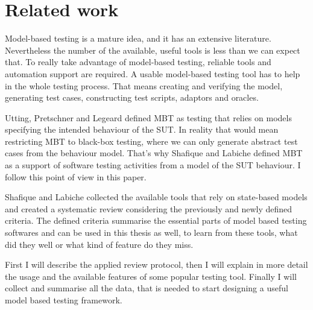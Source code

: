 \chapter{Related work}
\label{cha:relatedwork}

Model-based testing is a mature idea, and it has an extensive literature. Nevertheless the number of the available, useful tools is less than we can expect that. To really take advantage of model-based testing, reliable tools and automation support are required. A usable model-based testing tool has to help in the whole testing process. That means creating and verifying the model, generating test cases, constructing test scripts, adaptors and oracles.

Utting, Pretschner and Legeard \cite{taxonomy} defined MBT as testing that relies on models specifying the intended behaviour of the SUT. In reality that would mean restricting MBT to black-box testing, where we can only generate abstract test cases from the behaviour model. That's why Shafique and Labiche defined MBT as a support of software testing activities from a model of the SUT behaviour. I follow this point of view in this paper.

Shafique and Labiche \cite{toolsreview} collected the available tools that rely on state-based models and created a systematic review considering the previously and newly defined criteria. The defined criteria summarise the essential parts of model based testing softwares and can be used in this thesis as well, to learn from these tools, what did they well or what kind of feature do they miss.

First I will describe the applied review protocol, then I will explain in more detail the usage and the available features of some popular testing tool. Finally I will collect and summarise all the data, that is needed to start designing a useful model based testing framework.

